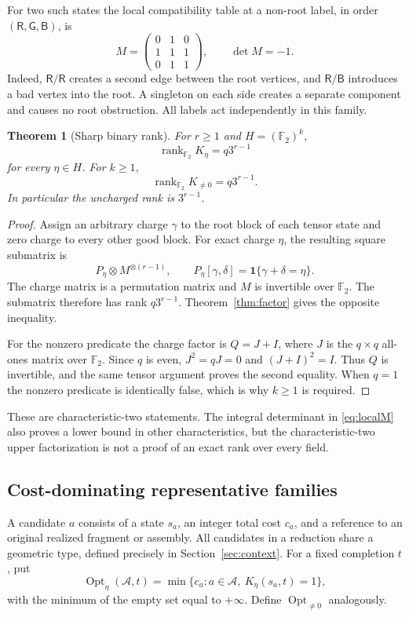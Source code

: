 \documentclass[11pt,letterpaper]{article}
\newtheorem{theorem}{Theorem}[section]
\theoremstyle{definition}
\newcommand{\F}{\mathbb F}
\newcommand{\rank}{\operatorname{rank}}
\newcommand{\Opt}{\operatorname{Opt}}
\newcommand{\ind}[1]{\mathbf 1\{#1\}}
\begin{document}
For two such states the local compatibility table at a non-root label, in order $(\mathsf R,\mathsf G,\mathsf B)$, is
\begin{equation}
 M=\begin{pmatrix}
 0&1&0\\
 1&1&1\\
 0&1&1
 \end{pmatrix},\qquad \det M=-1.\label{eq:localM}
\end{equation}
Indeed, $\mathsf R/\mathsf R$ creates a second edge between the root vertices, and $\mathsf R/\mathsf B$ introduces a bad vertex into the root. A singleton on each side creates a separate component and causes no root obstruction. All labels act independently in this family.

\begin{theorem}[Sharp binary rank]\label{thm:rank}
For $r\geq1$ and $H=(\F_2)^k$,
\[
 \rank_{\F_2}K_\eta=q3^{r-1}
\]
for every $\eta\in H$. For $k\geq1$,
\[
 \rank_{\F_2}K_{\ne0}=q3^{r-1}.
\]
In particular the uncharged rank is $3^{r-1}$.
\end{theorem}
\begin{proof}
Assign an arbitrary charge $\gamma$ to the root block of each tensor state and zero charge to every other good block. For exact charge $\eta$, the resulting square submatrix is
\[
 P_\eta\otimes M^{\otimes(r-1)},\qquad
 P_\eta[\gamma,\delta]=\ind{\gamma+\delta=\eta}.
\]
The charge matrix is a permutation matrix and $M$ is invertible over $\F_2$. The submatrix therefore has rank $q3^{r-1}$. Theorem~\ref{thm:factor} gives the opposite inequality.

For the nonzero predicate the charge factor is $Q=J+I$, where $J$ is the $q\times q$ all-ones matrix over $\F_2$. Since $q$ is even, $J^2=qJ=0$ and $(J+I)^2=I$. Thus $Q$ is invertible, and the same tensor argument proves the second equality. When $q=1$ the nonzero predicate is identically false, which is why $k\geq1$ is required.
\end{proof}

These are characteristic-two statements. The integral determinant in \eqref{eq:localM} also proves a lower bound in other characteristics, but the characteristic-two upper factorization is not a proof of an exact rank over every field.

\subsection{Cost-dominating representative families}
A candidate $a$ consists of a state $s_a$, an integer total cost $c_a$, and a reference to an original realized fragment or assembly. All candidates in a reduction share a geometric type, defined precisely in Section~\ref{sec:context}. For a fixed completion $t$, put
\[
 \Opt_\eta(\mathcal A,t)=\min\{c_a:a\in\mathcal A,\ K_\eta(s_a,t)=1\},
\]
with the minimum of the empty set equal to $+\infty$. Define $\Opt_{\ne0}$ analogously.
\end{document}
